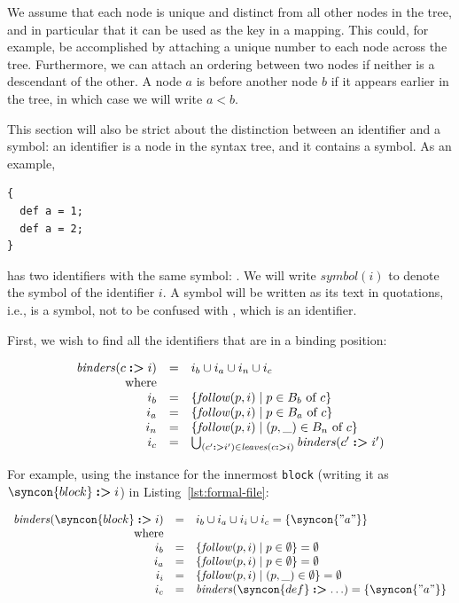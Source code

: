 \documentclass{kththesis}
\begin{document}
We assume that each node is unique and distinct from all other nodes in the tree, and in particular that it can be used as the key in a mapping. This could, for example, be accomplished by attaching a unique number to each node across the tree. Furthermore, we can attach an ordering between two nodes if neither is a descendant of the other. A node $a$ is before another node $b$ if it appears earlier in the tree, in which case we will write $a < b$.


This section will also be strict about the distinction between an identifier and a symbol: an identifier is a node in the syntax tree, and it contains a symbol. As an example,

\begin{verbatim}
{
  def a = 1;
  def a = 2;
}
\end{verbatim}

\newcommand{\sym}{\ensuremath{\mathit{symbol}}}
\newcommand{\symlit}[1]{\text{''#1''}}

has two identifiers with the same symbol: \symlit{a}. We will write $\sym(i)$ to denote the symbol of the identifier $i$. A symbol will be written as its text in quotations, i.e., \symlit{a} is a symbol, not to be confused with , which is an identifier.

First, we wish to find all the identifiers that are in a binding position:

\newcommand{\binders}{\ensuremath{\mathit{binders}}}

$$
\begin{array}{rcl}
\binders(c \tagged i) & = & i_b \cup i_a \cup i_n \cup i_c \\
\text{where} & & \\
i_b & = & \{ \follow(p, i) \mid p \in B_b \text{ of } c\} \\
i_a & = & \{ \follow(p, i) \mid p \in B_a \text{ of } c\} \\
i_n & = & \{ \follow(p, i) \mid (p, \_) \in B_n \text{ of } c\} \\
i_c & = & \bigcup_{(c' \tagged i') \in \leaves(c \tagged i)} \binders(c' \tagged i') \\
\end{array}
$$

For example, using the instance for the innermost \texttt{block} (writing it as $\syncon{block} \tagged i$) in Listing~\ref{lst:formal-file}:

$$
\begin{array}{rcl}
\binders(\syncon{block} \tagged i) & = & i_b \cup i_a \cup i_i \cup i_c = \{\syncon{"a"}\}\\
\text{where} & & \\
i_b & = & \{ \follow(p, i) \mid p \in \emptyset \} = \emptyset \\
i_a & = & \{ \follow(p, i) \mid p \in \emptyset \} = \emptyset \\
i_i & = & \{ \follow(p, i) \mid (p, \_) \in \emptyset \} = \emptyset \\
i_c & = & \binders(\syncon{def} \tagged \ldots) = \{\syncon{"a"}\} \\
\end{array}
$$
\end{document}
